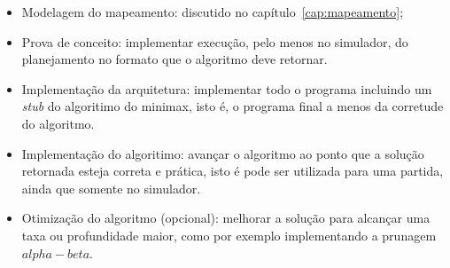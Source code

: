 \begin{itemize}
  \item Modelagem do mapeamento: discutido no capítulo~\ref{cap:mapeamento};
  \item Prova de conceito: implementar execução, pelo menos no simulador,
    do planejamento no formato que o algoritmo deve retornar.
  \item Implementação da arquitetura: implementar todo o programa incluindo um
    \textit{stub} do algoritimo do minimax, isto é, o programa final a menos da
    corretude do algoritmo.
  \item Implementação do algoritimo: avançar o algoritmo ao ponto que a solução
    retornada esteja correta e prática, isto é pode ser utilizada para uma
    partida, ainda que somente no simulador.
  \item Otimização do algoritmo (opcional): melhorar a solução para alcançar uma
    taxa ou profundidade maior, como por exemplo implementando a prunagem
    $alpha-beta$.
\end{itemize}

